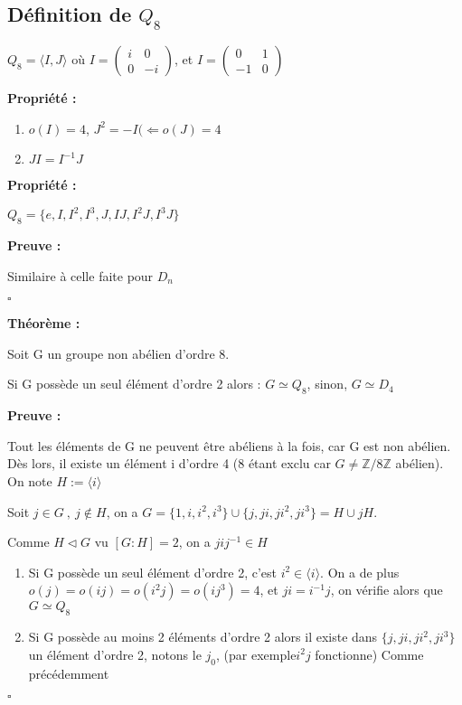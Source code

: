\documentclass{report}
\renewenvironment{leftbar}{%
  \def\FrameCommand{\vrule width 0.4pt \hspace{10pt}}%
  \MakeFramed {\advance\hsize-\width \FrameRestore}}%
 {\endMakeFramed}%
\newenvironment{preuve}{\vspace*{0.5cm}
    \begin{leftbar}
    \noindent\textbf{Preuve :}\par}{
    \begin{flushright}
    $\square$
    \end{flushright}
    \end{leftbar}
}
\newenvironment{prop}{\begin{tcolorbox}[colframe= white]
    \textbf{Propriété :}
     \par}
    {\end{tcolorbox}}
\newenvironment{theoreme}[1][]{
    \begin{tcolorbox}[]
    \textbf{Théorème :} #1  \par} 
    {\end{tcolorbox}}
\newcommand{\Z}{\mathbb{Z}}
\newcommand{\dn}{D_{n}}
\begin{document}
\subsection{Définition de $Q_{8}$}

$Q_{8}= \langle I,J \rangle$ où $I = \begin{pmatrix}
i&0\\
0&-i
\end{pmatrix}$, et $I = \begin{pmatrix}
0&1\\
-1&0
\end{pmatrix}$

\begin{prop}
\begin{enumerate}
\item $o(I)=4$, $J^2=-I(\Leftarrow o(J)=4$
\item $JI=I^{-1}J$
\end{enumerate}
\end{prop}


\begin{prop}
$Q_{8}= \{ e,I,I^{2},I^{3},J,IJ,I^{2}J,I^{3}J \}$
\end{prop}
\begin{preuve}
Similaire à celle faite pour $\dn$
\end{preuve}


\begin{theoreme}
Soit G un groupe non abélien d'ordre 8.\par
Si G possède un seul élément d'ordre 2 alors : $G\simeq Q_{8}$, sinon, $G\simeq D_{4}$
\end{theoreme}


\begin{preuve}
Tout les éléments de G ne peuvent être abéliens à la fois, car G est non abélien. Dès lors, il existe un élément i d'ordre 4 (8 étant exclu car $G\neq \Z/8\Z$ abélien). On note $H:=\langle i \rangle$\par 
Soit $j\in G~,~ j\notin H$, on a $G = \{ 1,i,i^2,i^3 \} \cup \{ j,ji,ji^2,ji^3 \} = H \cup jH$.\par
Comme $H\triangleleft G$ vu $[G:H]=2$, on a $jij^{-1} \in H$

\begin{enumerate}
\item Si G possède un seul élément d'ordre 2, c'est  $i^{2}\in \langle i \rangle$. On a de plus $o(j)=o(ij)=o(i^{2}j)=o(ij^{3})=4$, et $ji=i^{-1}j$, on vérifie alors que $G\simeq Q_{8}$
\item
Si G possède au moins 2 éléments d'ordre 2 alors il existe dans $ \{ j,ji,ji^2,ji^3 \}$ un élément d'ordre 2, notons le $j_{0}$, (par exemple$i^{2}j$ fonctionne)
Comme précédemment 

\end{enumerate}
\end{preuve}
\end{document}

